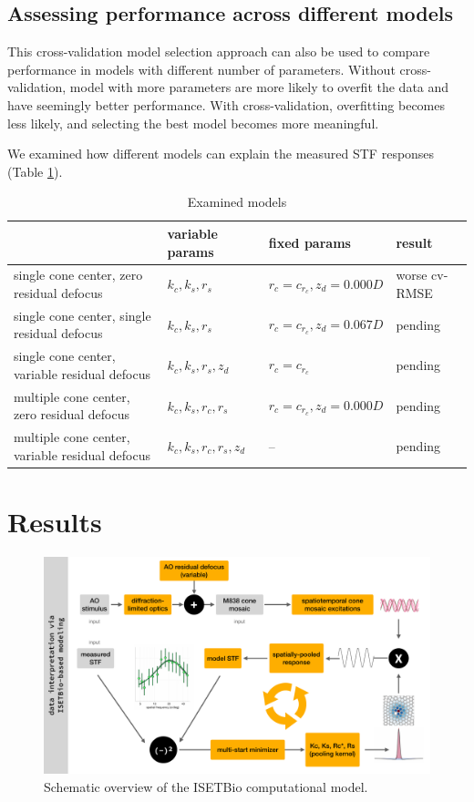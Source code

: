 \documentclass[11pt, oneside]{article}   	%
\begin{document}
\subsection{Assessing performance across different models}
This cross-validation model selection approach can also be used to compare performance in models with different number of parameters. Without cross-validation, model with more parameters are more likely to overfit the data and have seemingly better performance. With cross-validation, overfitting becomes less likely, and selecting the best model becomes more meaningful. 

We examined how different models can explain the measured STF responses (Table \ref{table:ModelAssessment}).

\begin{table}[h]
\centering
\begin{tabular}{|l | l  l |l |}
\hline
\rowcolor{LightSlateGray!35!Lavender}  \multicolumn{1}{|l|}{\textbf{model description}} & \textbf{variable params} & \textbf{fixed params} & \textbf{result} \\
\hline
\hline
single cone center, zero residual defocus        & $k_c, k_s, r_s$                 &  $r_c = c_{r_c}, z_{d} = 0.000D$ & worse cv-RMSE \\
single cone center, single residual defocus        & $k_c, k_s, r_s$                 &  $r_c = c_{r_c}, z_{d} = 0.067D$ & pending \\
single cone center, variable residual defocus      & $k_c, k_s, r_s, z_{d}$ & $r_c = c_{r_c}$ & pending \\
multiple cone center, zero residual defocus        & $k_c, k_s, r_c, r_s$                 &  $r_c = c_{r_c}, z_{d} = 0.000D$ & pending \\
multiple cone center, variable residual defocus    & $k_c, k_s, r_c, r_s, z_{d}$ & -- &  pending \\
\hline
\end{tabular}
\caption{Examined models}
\label{table:ModelAssessment}
\end{table}

\section{Results}

\begin{figure}[htbp] %
   \centering
   \includegraphics[width=7in]{Figures/ModelOverview.pdf} 
   \caption{Schematic overview of the ISETBio computational model.}
   \label{fig:ModelOverview}
\end{figure}
\end{document}
